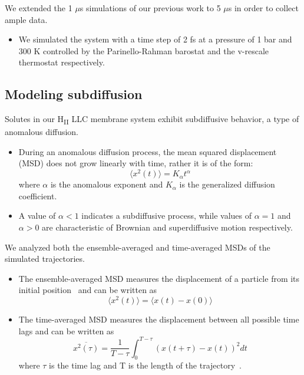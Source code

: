 \documentclass{article}
\begin{document}
  We extended the 1 $\mu$s simulations of our previous work to 5 $\mu$s in order
  to collect ample data.
  \begin{itemize}
    \item We simulated the system with a time step of 2 fs at a pressure of 1 bar
    and 300 K controlled by the Parinello-Rahman barostat and the v-rescale thermostat
    respectively.
  \end{itemize}
  
  \subsection{Modeling subdiffusion}\label{method:model_sFBM}

  Solutes in our H\textsubscript{II} LLC membrane system exhibit subdiffusive
  behavior, a type of anomalous diffusion.
  \begin{itemize}
  	\item During an anomalous diffusion process, the mean squared displacement (MSD)
  	does not grow linearly with time, rather it is of the form:
	\begin{equation} 
	\langle x^2(t) \rangle = K_{\alpha}t^\alpha
	\label{eqn:msd_form}
	\end{equation} 
	where $\alpha$ is the anomalous exponent and $K_\alpha$ is the
	generalized diffusion coefficient.
	\item A value of $\alpha < 1$ indicates a subdiffusive process, while values of
	$\alpha = 1$ and $\alpha > 0$ are characteristic of Brownian and superdiffusive
	motion respectively.
  \end{itemize}

  \noindent We analyzed both the ensemble-averaged and time-averaged MSDs
  of the simulated trajectories.
  \begin{itemize}
	\item The ensemble-averaged MSD measures the displacement of a particle from its initial
	position~\cite{meroz_toolbox_2015} and can be written as
	\begin{equation}
	\langle x^2(t) \rangle = \langle x(t) - x(0) \rangle
	\label{eqn:ensemble_msd}
	\end{equation}
	\item The time-averaged MSD measures the displacement between all possible time lags
	and can be written as
	\begin{equation}
	\overline{x^2(\tau)} = \dfrac{1}{T - \tau}\int_{0}^{T - \tau} (x(t + \tau) - x(t))^2 dt
	\end{equation}
	where $\tau$ is the time lag and T is the length of the
	trajectory~\cite{meroz_toolbox_2015}. 
  \end{itemize}
  
\end{document}
